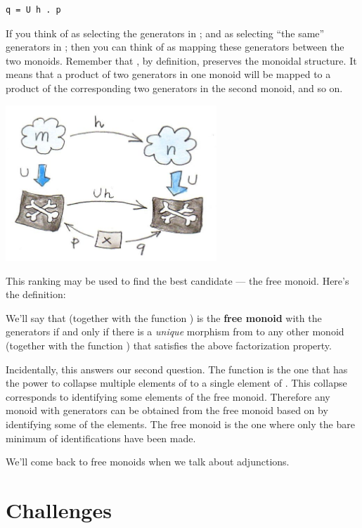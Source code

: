 \begin{verbatim}
q = U h . p
\end{verbatim}

If you think of  as selecting the generators in ;
and  as selecting ``the same'' generators in ; then
you can think of  as mapping these generators between the two
monoids. Remember that , by definition, preserves the monoidal
structure. It means that a product of two generators in one monoid will
be mapped to a product of the corresponding two generators in the second
monoid, and so on.

\includegraphics[width=3.12500in]{images/monoid-ranking.jpg}

This ranking may be used to find the best candidate --- the free monoid.
Here's the definition:

We'll say that  (together with the function ) is the
\textbf{free monoid} with the generators  if and only if there
is a \emph{unique} morphism  from  to any other
monoid  (together with the function ) that satisfies
the above factorization property.

Incidentally, this answers our second question. The function
 is the one that has the power to collapse multiple
elements of  to a single element of . This
collapse corresponds to identifying some elements of the free monoid.
Therefore any monoid with generators  can be obtained from the
free monoid based on  by identifying some of the elements. The
free monoid is the one where only the bare minimum of identifications
have been made.

We'll come back to free monoids when we talk about adjunctions.

\section{Challenges}\label{challenges}

